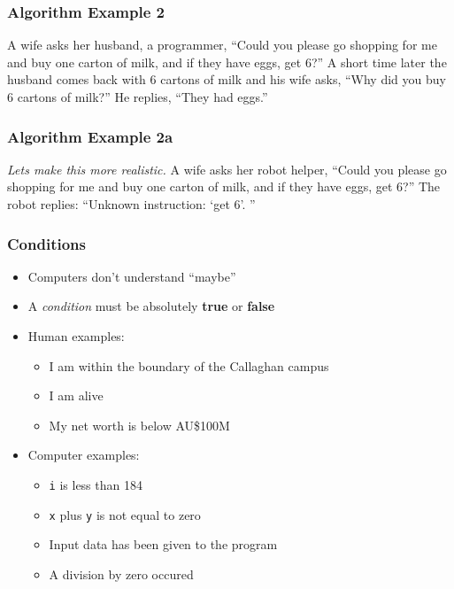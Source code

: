 \documentclass[14pt]{beamer}
\begin{document}
\begin{frame}
\frametitle{Algorithm Example 2}
A wife asks her husband, a programmer, ``Could you please go shopping for me and buy one carton of milk, and if they have eggs, get 6?”
\linebreak \linebreak
A short time later the husband comes back with 6 cartons of milk and his wife asks, ``Why did you buy 6 cartons of milk?”
\linebreak \linebreak
He replies, “They had eggs.”
\end{frame}

\begin{frame}
\frametitle{Algorithm Example 2a}
\textit{Lets make this more realistic.}
\linebreak \linebreak
A wife asks her robot helper, ``Could you please go shopping for me and buy one carton of milk, and if they have eggs, get 6?”
\linebreak \linebreak
The robot replies: ``Unknown instruction: `get 6'. ''
\end{frame}

\begin{frame}
\frametitle{Conditions}
\begin{itemize}
\item Computers don't understand ``maybe''
\item A \textit{condition} must be absolutely \textbf{true} or \textbf{false}
\item Human examples:
	\begin{itemize}
		\item I am within the boundary of the Callaghan campus
		\item I am alive
		\item My net worth is below AU\$100M
	\end{itemize}
\item Computer examples:
	\begin{itemize}
		\item \texttt{i} is less than 184
		\item \texttt{x} plus \texttt{y} is not equal to zero
		\item Input data has been given to the program
		\item A division by zero occured
	\end{itemize}
\end{itemize}
\end{frame}
\end{document}
